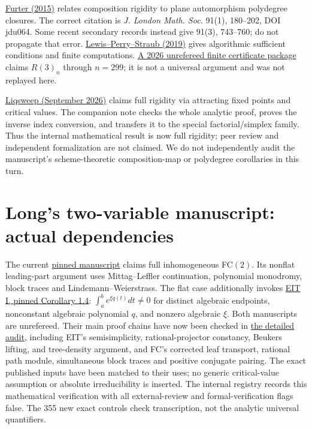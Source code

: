 \documentclass[11pt]{article}
\begin{document}
\href{https://doi.org/10.1112/jlms/jdu064}{Furter (2015)} relates composition
rigidity to plane automorphism polydegree closures. The correct citation is
\emph{J. London Math. Soc.} 91(1), 180--202, DOI jdu064. Some recent
secondary records instead give 91(3), 743--760; do not propagate that error.
\href{https://arminstraub.com/downloads/pub/polydegree-conjecture.pdf}{Lewis--Perry--Straub (2019)}
gives algorithmic sufficient conditions and finite computations.
\href{https://github.com/ipitchford/furter-r3-through-299}{A 2026 unrefereed
finite certificate package} claims $R(3)_n$ through $n=299$; it is not a
universal argument and was not replayed here.

\href{https://github.com/blueberryvertigo/polynomial-composition-rigidity/tree/051c74aad9ef9bf8804c371964803aee099c5b63}{Liqsweep (September 2026)}
claims full rigidity via attracting fixed points and critical values.
The companion note checks the whole analytic proof, proves the inverse
index conversion, and transfers it to the special factorial/simplex family.
Thus the internal mathematical result is now full rigidity; peer review
and independent formalization are not claimed. We do not independently
audit the manuscript's scheme-theoretic composition-map or polydegree
corollaries in this turn.

\section*{Long's two-variable manuscript: actual dependencies}
The current \href{https://github.com/long-mathematics/factorial-conjecture-two-variables/tree/8b1eb46ff530122ed25f588b78bf9fdc98cb9577}{pinned manuscript}
claims full inhomogeneous FC$(2)$. Its nonflat leading-part argument uses
Mittag--Leffler continuation, polynomial monodromy, block traces and
Lindemann--Weierstrass. The flat case additionally invokes
\href{https://github.com/long-mathematics/exponential-integral-theorem/blob/22d98c4f27e606b5b25fa673c33f9c56c53cc86b/papers/01-exponential-integral-theorem/exponential-integral-theorem.tex}{EIT I, pinned Corollary 1.4}:
$\int_a^b e^{\xi q(t)}dt\ne0$ for distinct algebraic endpoints, nonconstant
algebraic polynomial $q$, and nonzero algebraic $\xi$.
Both manuscripts are unrefereed. Their main proof chains have now been
checked in \href{LONG_EIT_AND_FC2_AUDIT.tex}{the detailed audit}, including
EIT's semisimplicity, rational-projector constancy, Beukers lifting, and
tree-density argument, and FC's corrected leaf transport, rational path
module, simultaneous block traces and positive conjugate pairing.
The exact published inputs have been matched to their uses; no generic
critical-value assumption or absolute irreducibility is inserted.
The internal registry records this mathematical verification with all
external-review and formal-verification flags false. The 355 new exact
controls check transcription, not the analytic universal quantifiers.
\end{document}
